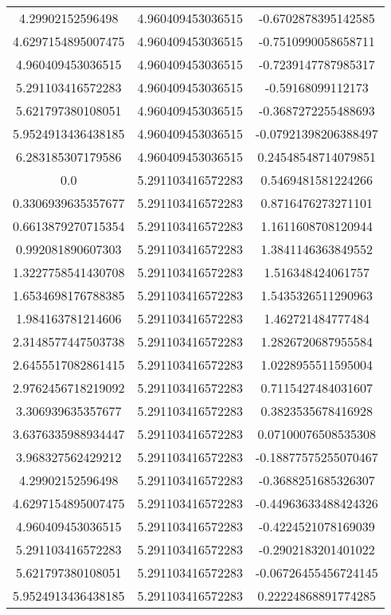 \begin{table}
\begin{tabular}{ccc}
4.29902152596498 & 4.960409453036515 & -0.6702878395142585 \\
4.6297154895007475 & 4.960409453036515 & -0.7510990058658711 \\
4.960409453036515 & 4.960409453036515 & -0.7239147787985317 \\
5.291103416572283 & 4.960409453036515 & -0.59168099112173 \\
5.621797380108051 & 4.960409453036515 & -0.3687272255488693 \\
5.9524913436438185 & 4.960409453036515 & -0.07921398206388497 \\
6.283185307179586 & 4.960409453036515 & 0.24548548714079851 \\
0.0 & 5.291103416572283 & 0.5469481581224266 \\
0.3306939635357677 & 5.291103416572283 & 0.8716476273271101 \\
0.6613879270715354 & 5.291103416572283 & 1.1611608708120944 \\
0.992081890607303 & 5.291103416572283 & 1.3841146363849552 \\
1.3227758541430708 & 5.291103416572283 & 1.516348424061757 \\
1.6534698176788385 & 5.291103416572283 & 1.5435326511290963 \\
1.984163781214606 & 5.291103416572283 & 1.462721484777484 \\
2.3148577447503738 & 5.291103416572283 & 1.2826720687955584 \\
2.6455517082861415 & 5.291103416572283 & 1.0228955511595004 \\
2.9762456718219092 & 5.291103416572283 & 0.7115427484031607 \\
3.306939635357677 & 5.291103416572283 & 0.3823535678416928 \\
3.6376335988934447 & 5.291103416572283 & 0.07100076508535308 \\
3.968327562429212 & 5.291103416572283 & -0.18877575255070467 \\
4.29902152596498 & 5.291103416572283 & -0.3688251685326307 \\
4.6297154895007475 & 5.291103416572283 & -0.44963633488424326 \\
4.960409453036515 & 5.291103416572283 & -0.4224521078169039 \\
5.291103416572283 & 5.291103416572283 & -0.2902183201401022 \\
5.621797380108051 & 5.291103416572283 & -0.06726455456724145 \\
5.9524913436438185 & 5.291103416572283 & 0.22224868891774285 \\

\end{tabular}
\end{table}
